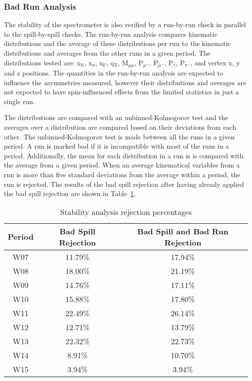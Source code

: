 \subsubsection{Bad Run Analysis}
The stability of the spectrometer is also verified by a run-by-run check in
parallel to the spill-by-spill checks.  The run-by-run analysis compares
kinematic distributions and the average of these distributions per run to the
kinematic distributions and averages from the other runs in a given period.  The
distributions tested are: x$_{\mathrm{N}}$, x$_{\pi}$, x$_{\mathrm{F}}$,
q$_{\mathrm{T}}$, M$_{\mu\mu}$, P$_{\mu^+}$, P$_{\mu^-}$, P$_{\gamma}$,
P$_{\pi^-}$, and vertex x, y and z positions.  The quantities in the run-by-run
analysis are expected to influence the asymmetries measured, however their
distributions and averages are not expected to have spin-influenced effects from
the limited statistics in just a single run.

The distributions are compared with an unbinned-Kolmogorov test and the
averages over a distribution are compared based on their deviations from each
other.  The unbinned-Kolmogorov test is made between all the runs in a given
period.  A run is marked bad if it is incompatible with most of the runs in a
period.  Additionally, the mean for each distribution in a run is is compared
with the average from a given period.  When an average kinematical variables
from a run is more than five standard deviations from the average within a
period, the run is rejected.  The results of the bad spill rejection after
having already applied the bad spill rejection are shown in
Table~\ref{tab::badspillpercent}.

\begin{table}[h!t]
  \centering
  \begin{tabular}{ |c|c|c| }
    \hline \textbf{Period}& \textbf{Bad Spill Rejection}&
    \textbf{Bad Spill and Bad Run Rejection} \\ \hline \hline
    
    W07& 11.79\%& 17.94\%\\ \hline
    W08& 18.00\%& 21.19\%\\ \hline
    W09& 14.76\%& 17.11\%\\ \hline
    W10& 15.88\%& 17.80\%\\ \hline
    W11& 22.49\%& 26.14\%\\ \hline
    W12& 12.71\%& 13.79\%\\ \hline
    W13& 22.32\%& 22.73\%\\ \hline
    W14& 8.91\%& 10.70\%\\ \hline
    W15& 3.94\%& 3.94\%\\ \hline

  \end{tabular}
  \caption{Stability analysis rejection percentages}
  \label{tab::badspillpercent}
\end{table}

